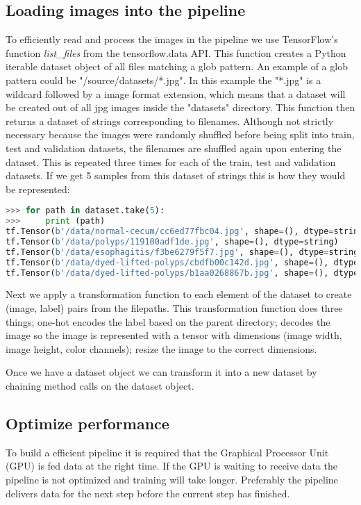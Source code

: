 \documentclass[thesis.tex]{subfiles}
\begin{document}
\subsection{Loading images into the pipeline}
To efficiently read and process the images in the pipeline we use TensorFlow's function \textit{list\_files} from the tensorflow.data API. This function creates a Python iterable dataset object of all files matching a glob pattern. An example of a glob pattern could be "/source/datasets/*.jpg". In this example the "*.jpg" is a wildcard followed by a image format extension, which means that a dataset will be created out of all jpg images inside the "datasets" directory. This function then returns a dataset of strings corresponding to filenames. Although not strictly necessary because the images were randomly shuffled before being split into train, test and validation datasets, the filenames are shuffled again upon entering the dataset. This is repeated three times for each of the train, test and validation datasets. If we get 5 samples from this dataset of strings this is how they would be represented:

\begin{lstlisting}[language=Python]
>>> for path in dataset.take(5):
>>> 	print (path)
tf.Tensor(b'/data/normal-cecum/cc6ed77fbc04.jpg', shape=(), dtype=string)
tf.Tensor(b'/data/polyps/119100adf1de.jpg', shape=(), dtype=string)
tf.Tensor(b'/data/esophagitis/f3be6279f5f7.jpg', shape=(), dtype=string)
tf.Tensor(b'/data/dyed-lifted-polyps/cbdfb00c142d.jpg', shape=(), dtype=string)
tf.Tensor(b'/data/dyed-lifted-polyps/b1aa0268867b.jpg', shape=(), dtype=string)
\end{lstlisting}

Next we apply a transformation function to each element of the dataset to create (image, label) pairs from the filepaths. This transformation function does three things; one-hot encodes the label based on the parent directory; decodes the image so the image is represented with a tensor with dimensions (image width, image height, color channels); resize the image to the correct dimensions. 

Once we have a dataset object we can transform it into a new dataset by chaining method calls on the dataset object.


\subsection{Optimize performance}
To build a efficient pipeline it is required that the Graphical Processor Unit (GPU) is fed data at the right time. If the GPU is waiting to receive data the pipeline is not optimized and training will take longer. Preferably the pipeline delivers data for the next step before the current step has finished. 
\end{document}
